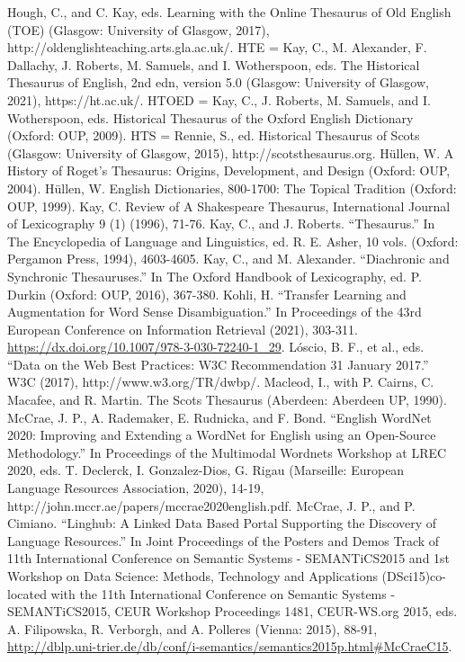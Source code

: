 Hough, C., and C. Kay, eds. Learning with the Online Thesaurus of Old English (TOE) (Glasgow: University of Glasgow, 2017), http://oldenglishteaching.arts.gla.ac.uk/.
HTE = Kay, C., M. Alexander, F. Dallachy, J. Roberts, M. Samuels, and I. Wotherspoon, eds. The Historical Thesaurus of English, 2nd edn, version 5.0 (Glasgow: University of Glasgow, 2021), https://ht.ac.uk/.
HTOED = Kay, C., J. Roberts, M. Samuels, and I. Wotherspoon, eds. Historical Thesaurus of the Oxford English Dictionary (Oxford: OUP, 2009).
HTS = Rennie, S., ed. Historical Thesaurus of Scots (Glasgow: University of Glasgow, 2015), http://scotsthesaurus.org.
Hüllen, W. A History of Roget’s Thesaurus: Origins, Development, and Design (Oxford: OUP, 2004).
Hüllen, W. English Dictionaries, 800-1700: The Topical Tradition (Oxford: OUP, 1999).
Kay, C. Review of A Shakespeare Thesaurus, International Journal of Lexicography 9 (1) (1996), 71-76.
Kay, C., and J. Roberts. “Thesaurus.” In The Encyclopedia of Language and Linguistics, ed. R. E. Asher, 10 vols. (Oxford: Pergamon Press, 1994), 4603-4605.
Kay, C., and M. Alexander. “Diachronic and Synchronic Thesauruses.” In The Oxford Handbook of Lexicography, ed. P. Durkin (Oxford: OUP, 2016), 367-380.
Kohli, H. “Transfer Learning and Augmentation for Word Sense Disambiguation.” In Proceedings of the 43rd European Conference on Information Retrieval (2021), 303-311. \url{https://dx.doi.org/10.1007/978-3-030-72240-1_29}.
Lóscio, B. F., et al., eds. “Data on the Web Best Practices: W3C Recommendation 31 January 2017.” W3C (2017), http://www.w3.org/TR/dwbp/.
Macleod, I., with P. Cairns, C. Macafee, and R. Martin. The Scots Thesaurus (Aberdeen: Aberdeen UP, 1990).
McCrae, J. P., A. Rademaker, E. Rudnicka, and F. Bond. “English WordNet 2020: Improving and Extending a WordNet for English using an Open-Source Methodology.” In Proceedings of the Multimodal Wordnets Workshop at LREC 2020, eds. T. Declerck, I. Gonzalez-Dios, G. Rigau (Marseille: European Language Resources Association, 2020), 14-19, http://john.mccr.ae/papers/mccrae2020english.pdf.
McCrae, J. P., and P. Cimiano. “Linghub: A Linked Data Based Portal Supporting the Discovery of Language Resources.” In Joint Proceedings of the Posters and Demos Track of 11th International Conference on Semantic Systems - SEMANTiCS2015 and 1st Workshop on Data Science: Methods, Technology and Applications (DSci15)co-located with the 11th International Conference on Semantic Systems - SEMANTiCS2015, CEUR Workshop Proceedings 1481, CEUR-WS.org 2015, eds. A. Filipowska, R. Verborgh, and A. Polleres (Vienna: 2015), 88-91, \url{http://dblp.uni-trier.de/db/conf/i-semantics/semantics2015p.html#McCraeC15}.
